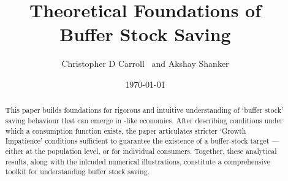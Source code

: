 \documentclass[BufferStockTheory]{subfiles}
\begin{document}



\title{Theoretical Foundations of \\ Buffer Stock Saving}

\author{Christopher D Carroll         ~and Akshay Shanker}



\date{\today}

\maketitle
\hypertarget{abstract}{}
\begin{abstract}
  This paper builds foundations for rigorous and intuitive understanding of `buffer stock' saving behaviour that can emerge in \cite{bewleyPIH}-like economies.
  After describing conditions under which a consumption function exists, the paper articulates stricter `Growth Impatience' conditions sufficient to guarantee the existence of a buffer-stock target --- either at the population level, or for individual consumers.
  Together, these analytical results, along with the inlcuded numerical illustrations, constitute a comprehensive toolkit for understanding buffer stock saving.
\end{abstract}

\hypertarget{links}{}
\end{document}
